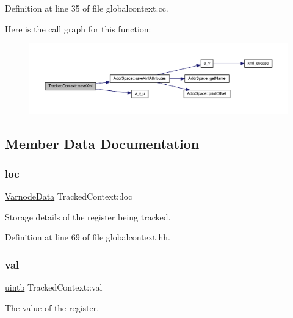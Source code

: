 Definition at line 35 of file globalcontext.\+cc.

Here is the call graph for this function\+:
\nopagebreak
\begin{figure}[H]
\begin{center}
\leavevmode
\includegraphics[width=350pt]{struct_tracked_context_a8a8218db31e360cdb0f60ccada0dc709_cgraph}
\end{center}
\end{figure}


\subsection{Member Data Documentation}
\mbox{\label{struct_tracked_context_aa0b1520b744217f2f9887a71c7422c41}} 
\subsubsection{\texorpdfstring{loc}{loc}}
{\footnotesize\ttfamily \mbox{\hyperlink{struct_varnode_data}{Varnode\+Data}} Tracked\+Context\+::loc}



Storage details of the register being tracked. 



Definition at line 69 of file globalcontext.\+hh.

\mbox{\label{struct_tracked_context_a7ced282753847ba1cc462d4233fbb3e7}} 
\subsubsection{\texorpdfstring{val}{val}}
{\footnotesize\ttfamily \mbox{\hyperlink{types_8h_a2db313c5d32a12b01d26ac9b3bca178f}{uintb}} Tracked\+Context\+::val}



The value of the register. 



